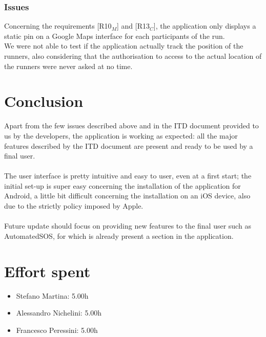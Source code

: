 \documentclass{article}
\begin{document}
\subsubsection{Issues}
Concerning the requirements {[R10$_M$]} and {[R13$_C$]}, the application only displays a static pin on a Google Maps interface for each participants of the run. \\ We were not able to test if the application actually track the position of the runners, also considering that the authorisation to access to the actual location of the runners were never asked at no time.

\newpage
\section{Conclusion}
Apart from the few issues described above and in the ITD document provided to us by the developers, the application is working as expected: all the major features described by the ITD document are present and ready to be used by a final user. \\\\
The user interface is pretty intuitive and easy to user, even at a first start; the initial set-up is super easy concerning the installation of the application for Android, a little bit difficult concerning the installation on an iOS device, also due to the strictly policy imposed by Apple. \\\\
Future update should focus on providing new features to the final user such as AutomatedSOS, for which is already present a section in the application.

\newpage
\section{Effort spent}
\begin{itemize}
	\item Stefano Martina: 5.00h
	\item Alessandro Nichelini: 5.00h
	\item Francesco Peressini: 5.00h
\end{itemize}
\end{document}
